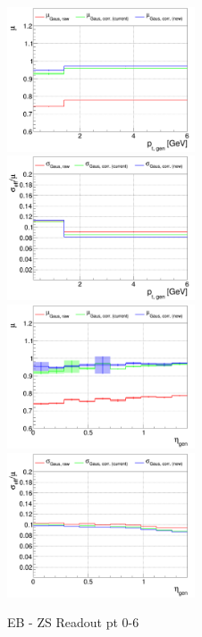 \begin{figure}
\includegraphics[width=0.495\textwidth]{./plots_pdf/ECAL_plots/plotsNOPU/EB/ZS/pdf/GENPT/EBZS_GENPT_0000_0006_MuOverBins.pdf}
\includegraphics[width=0.495\textwidth]{./plots_pdf/ECAL_plots/plotsNOPU/EB/ZS/pdf/GENPT/EBZS_GENPT_0000_0006_EffSigmaOverBins.pdf}
\includegraphics[width=0.495\textwidth]{./plots_pdf/ECAL_plots/plotsNOPU/EB/ZS/pdf/GENETA/EBZS_GENETA_0000_0006_MuOverBins.pdf}
\includegraphics[width=0.495\textwidth]{./plots_pdf/ECAL_plots/plotsNOPU/EB/ZS/pdf/GENETA/EBZS_GENETA_0000_0006_EffSigmaOverBins.pdf}
\caption{EB - ZS Readout pt 0-6}
\end{figure}


